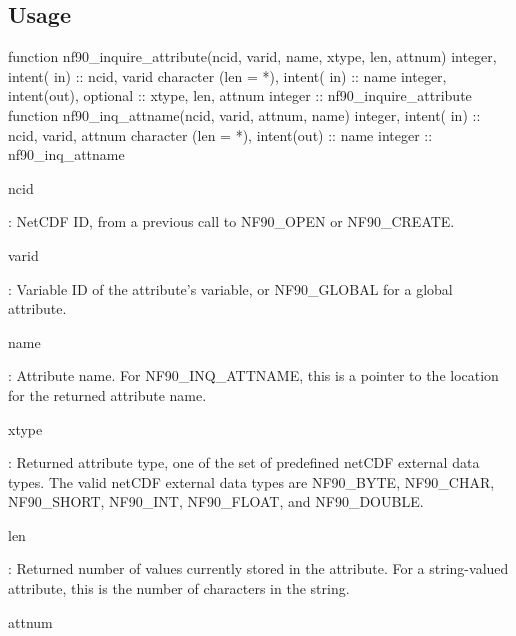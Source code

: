 \subsection*{Usage}


\begin{DoxyCode}
\textcolor{keyword}{function }nf90\_inquire\_attribute(ncid, varid, name, xtype, len, attnum)
  \textcolor{keywordtype}{integer},             \textcolor{keywordtype}{intent( in)}           :: ncid, varid
  \textcolor{keywordtype}{character (len = *)}, \textcolor{keywordtype}{intent( in)}           :: name
  \textcolor{keywordtype}{integer},             \textcolor{keywordtype}{intent(out)}, \textcolor{keywordtype}{optional} :: xtype, len, attnum
  \textcolor{keywordtype}{integer}                                    :: nf90\_inquire\_attribute
\textcolor{keyword}{function }nf90\_inq\_attname(ncid, varid, attnum, name)
  \textcolor{keywordtype}{integer},             \textcolor{keywordtype}{intent( in)} :: ncid, varid, attnum
  \textcolor{keywordtype}{character (len = *)}, \textcolor{keywordtype}{intent(out)} :: name
  \textcolor{keywordtype}{integer}                          :: nf90\_inq\_attname
\end{DoxyCode}


{\ttfamily ncid}

\+: Net\+C\+DF ID, from a previous call to N\+F90\+\_\+\+O\+P\+EN or N\+F90\+\_\+\+C\+R\+E\+A\+TE.

{\ttfamily varid}

\+: Variable ID of the attribute’s variable, or N\+F90\+\_\+\+G\+L\+O\+B\+AL for a global attribute.

{\ttfamily name}

\+: Attribute name. For N\+F90\+\_\+\+I\+N\+Q\+\_\+\+A\+T\+T\+N\+A\+ME, this is a pointer to the location for the returned attribute name.

{\ttfamily xtype}

\+: Returned attribute type, one of the set of predefined net\+C\+DF external data types. The valid net\+C\+DF external data types are N\+F90\+\_\+\+B\+Y\+TE, N\+F90\+\_\+\+C\+H\+AR, N\+F90\+\_\+\+S\+H\+O\+RT, N\+F90\+\_\+\+I\+NT, N\+F90\+\_\+\+F\+L\+O\+AT, and N\+F90\+\_\+\+D\+O\+U\+B\+LE.

{\ttfamily len}

\+: Returned number of values currently stored in the attribute. For a string-\/valued attribute, this is the number of characters in the string.

{\ttfamily attnum}

